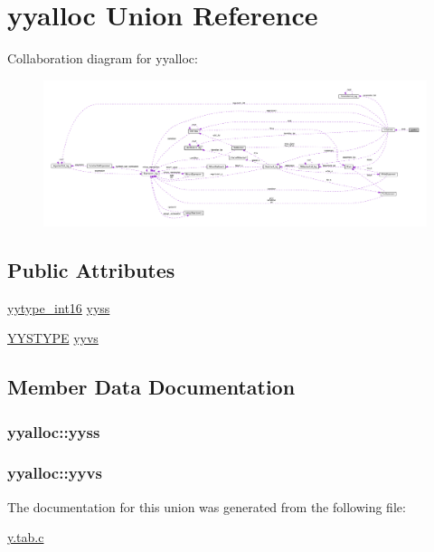 \hypertarget{unionyyalloc}{}\section{yyalloc Union Reference}
\label{unionyyalloc}


Collaboration diagram for yyalloc\+:\nopagebreak
\begin{figure}[H]
\begin{center}
\leavevmode
\includegraphics[width=350pt]{unionyyalloc__coll__graph}
\end{center}
\end{figure}
\subsection*{Public Attributes}
\begin{DoxyCompactItemize}
\item 
\hyperlink{y_8tab_8c_ade5b97f0021a4f6c5922ead3744ab297}{yytype\+\_\+int16} \hyperlink{unionyyalloc_aad44e4a724037e32eeb58333c516bb45}{yyss}
\item 
\hyperlink{union_y_y_s_t_y_p_e}{Y\+Y\+S\+T\+Y\+P\+E} \hyperlink{unionyyalloc_a9494cc8d8cd0eba1b44ca20fe89de5d2}{yyvs}
\end{DoxyCompactItemize}


\subsection{Member Data Documentation}
\hypertarget{unionyyalloc_aad44e4a724037e32eeb58333c516bb45}{}
\subsubsection[{yyss}]{ yyalloc\+::yyss}\label{unionyyalloc_aad44e4a724037e32eeb58333c516bb45}
\hypertarget{unionyyalloc_a9494cc8d8cd0eba1b44ca20fe89de5d2}{}
\subsubsection[{yyvs}]{ yyalloc\+::yyvs}\label{unionyyalloc_a9494cc8d8cd0eba1b44ca20fe89de5d2}


The documentation for this union was generated from the following file\+:\begin{DoxyCompactItemize}
\item 
\hyperlink{y_8tab_8c}{y.\+tab.\+c}\end{DoxyCompactItemize}
